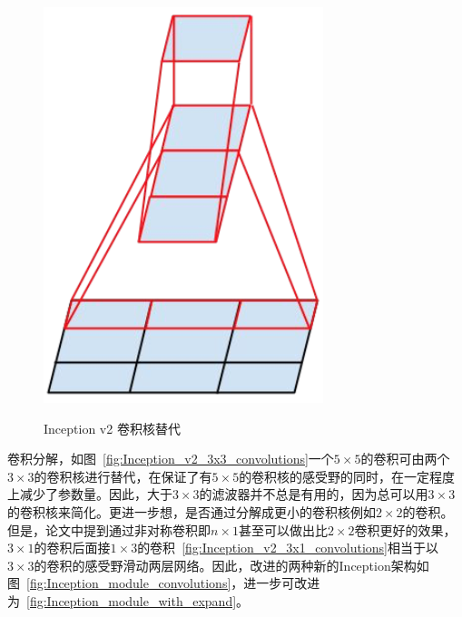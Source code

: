 \begin{figure}[htbp]
{\begin{minipage}{0.40\linewidth}
			\includegraphics[width = \linewidth]{readings_figures/Inception_v2_3x1.png}
			\label{fig:Inception_v2_3x1_convolutions}
		\end{minipage}
	}
	\centering
	\caption{Inception v2 卷积核替代}
	\label{fig:Inception_v2_convolutions}
\end{figure}

卷积分解，如图~\ref{fig:Inception_v2_3x3_convolutions}一个$5\times5$的卷积可由两个$3\times3$的卷积核进行替代，在保证了有$5\times5$的卷积核的感受野的同时，在一定程度上减少了参数量。因此，大于$3\times3$的滤波器并不总是有用的，因为总可以用$3\times3$的卷积核来简化。更进一步想，是否通过分解成更小的卷积核例如$2\times2$的卷积。但是，论文中提到通过非对称卷积即$n\times1$甚至可以做出比$2\times2$卷积更好的效果，$3\times1$的卷积后面接$1\times3$的卷积~\ref{fig:Inception_v2_3x1_convolutions}相当于以$3\times3$的卷积的感受野滑动两层网络。因此，改进的两种新的Inception架构如图~\ref{fig:Inception_module_convolutions}，进一步可改进为~\ref{fig:Inception_module_with_expand}。

